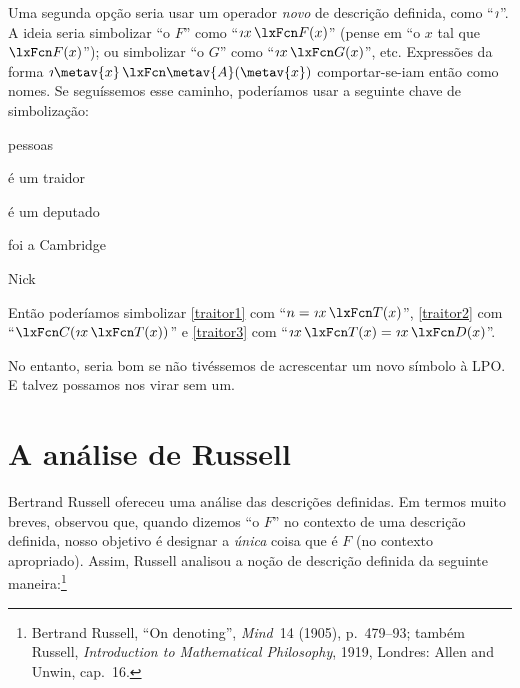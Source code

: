 Uma segunda opção seria usar um operador \emph{novo} de descrição definida, como \textquotedblleft $\maththe$\textquotedblright{}. A ideia seria simbolizar \textquotedblleft o $F$\textquotedblright{} como \textquotedblleft $\maththe x\,\atom{F}{x}$\textquotedblright{} (pense em \textquotedblleft o $x$ tal que $\atom{F}{x}$\textquotedblright{}); ou simbolizar \textquotedblleft o $G$\textquotedblright{} como \textquotedblleft $\maththe x\,\atom{G}{x}$\textquotedblright{}, etc. Expressões da forma $\maththe \metav{x}\, \atom{\metav{A}}{\metav{x}}$ comportar-se-iam então como nomes. Se seguíssemos esse caminho, poderíamos usar a seguinte chave de simbolização:
	\begin{ekey}
\item[\text{domínio}] pessoas
\item[\atom{T}{x}]  é um traidor
\item[\atom{D}{x}]  é um deputado
\item[\atom{C}{x}]  foi a Cambridge
		\item[n] Nick
	\end{ekey}
Então poderíamos simbolizar \cref{traitor1} com \textquotedblleft $n = \maththe x\, \atom{T}{x}$\textquotedblright{}, \cref{traitor2} com \textquotedblleft $\atom{C}{\maththe x\,\atom{T}{x}}$\textquotedblright{} e \cref{traitor3} com \textquotedblleft $\maththe x\, \atom{T}{x} = \maththe x\, \atom{D}{x}$\textquotedblright{}.

No entanto, seria bom se não tivéssemos de acrescentar um novo símbolo à LPO. E talvez possamos nos virar sem um.

\section{A análise de Russell}
Bertrand Russell ofereceu uma análise das descrições definidas. Em termos muito breves, observou que, quando dizemos \textquotedblleft o $F$\textquotedblright{} no contexto de uma descrição definida, nosso objetivo é designar a \emph{única} coisa que é $F$ (no contexto apropriado). Assim, Russell analisou a noção de descrição definida da seguinte maneira:\footnote{Bertrand Russell, \textquotedblleft On denoting\textquotedblright{}, \textit{Mind}~14 (1905), p.~479--93; também Russell, \textit{Introduction to Mathematical Philosophy}, 1919, Londres: Allen and Unwin, cap.~16.}







